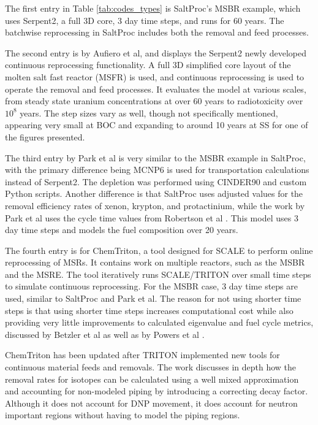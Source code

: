 The first entry in Table \ref{tab:codes_types} is SaltProc's MSBR example, which uses Serpent2, a full 3D core, 3 day time steps, and runs for 60 years. The batchwise reprocessing in SaltProc includes both the removal and feed processes.

The second entry is by Aufiero et al, and displays the Serpent2 newly developed continuous reprocessing functionality. A full 3D simplified core layout of the molten salt fast reactor (MSFR) is used, and continuous reprocessing is used to operate the removal and feed processes. It evaluates the model at various scales, from steady state uranium concentrations at over 60 years to radiotoxicity over $10^8$ years. The step sizes vary as well, though not specifically mentioned, appearing very small at BOC and expanding to around 10 years at SS for one of the figures presented.

The third entry by Park et al is very similar to the MSBR example in SaltProc, with the primary difference being MCNP6 is used for transportation calculations instead of Serpent2. The depletion was performed using CINDER90 and custom Python scripts. Another difference is that SaltProc uses adjusted values for the removal efficiency rates of xenon, krypton, and protactinium, while the work by Park et al uses the cycle time values from Robertson et al \cite{robertson_conceptual_1971}. This model uses 3 day time steps and models the fuel composition over 20 years.

The fourth entry is for ChemTriton, a tool designed for SCALE to perform online reprocessing of MSRs. It contains work on multiple reactors, such as the MSBR and the MSRE. The tool iteratively runs SCALE/TRITON over small time steps to simulate continuous reprocessing. For the MSBR case, 3 day time steps are used, similar to SaltProc and Park et al. The reason for not using shorter time steps is that using shorter time steps increases computational cost while also providing very little improvements to calculated eigenvalue and fuel cycle metrics, discussed by Betzler et al as well as by Powers et al \cite{powers_new_2013}.

ChemTriton has been updated after TRITON implemented new tools for continuous material feeds and removals. The work discusses in depth how the removal rates for isotopes can be calculated using a well mixed approximation and accounting for non-modeled piping by introducing a correcting decay factor. Although it does not account for DNP movement, it does account for neutron important regions without having to model the piping regions.

